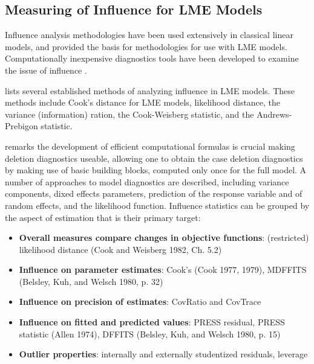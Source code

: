 \documentclass[12pt, a4paper]{report}
\theoremstyle{definition}
\theoremstyle{remark}
\begin{document}

%



\subsection{Measuring of Influence for LME Models}
Influence analysis methodologies have been used extensively in classical linear models, and provided the basis for methodologies for use with LME models. Computationally inexpensive diagnostics tools have been developed to examine the issue of influence \citep{Zewotir}. 

\citet{Zewotir} lists several established methods of analyzing influence in LME models. These methods include Cook's distance for LME models,
 likelihood distance,
the variance (information) ration,
the  Cook-Weisberg statistic, and
the  Andrews-Prebigon statistic.



\citet{Zewotir} remarks the development of efficient computational formulas is crucial making deletion diagnostics useable, allowing one to obtain the  case deletion diagnostics by making use of basic building blocks, computed only once for the full model. A number of approaches to model diagnostics are described, including variance components, dixed effects parameters, prediction of the response variable and of random effects, and the likelihood function. Influence statistics can be grouped by the aspect of estimation that is their primary target:
\begin{itemize}
\item \textbf{Overall measures compare changes in objective functions}: (restricted) likelihood distance (Cook and Weisberg 1982, Ch. 5.2)
\item \textbf{Influence on parameter estimates}: Cook's  (Cook 1977, 1979), MDFFITS (Belsley, Kuh, and Welsch 1980, p. 32)
\item \textbf{Influence on precision of estimates}: CovRatio and CovTrace
\item \textbf{Influence on fitted and predicted values}: PRESS residual, PRESS statistic (Allen 1974), DFFITS (Belsley, Kuh, and Welsch 1980, p. 15)
\item \textbf{Outlier properties}: internally and externally studentized residuals, leverage
\end{itemize}
\end{document}

